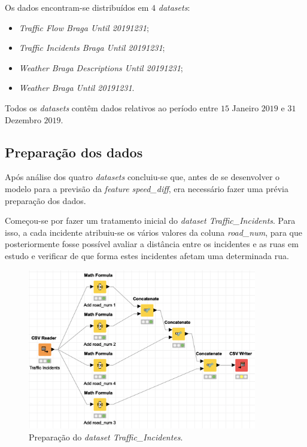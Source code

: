 \documentclass[a4paper, 12pt]{article}
\begin{document}
Os dados encontram-se distribuídos em $4$ \textit{datasets}:

\begin{itemize}
	\item \textit{Traffic Flow Braga Until 20191231};
	\item \textit{Traffic Incidents Braga Until 20191231};
	\item \textit{Weather Braga Descriptions Until 20191231};
	\item \textit{Weather Braga Until 20191231}.
\end{itemize}

Todos os \textit{datasets} contêm dados relativos ao período entre $15$ Janeiro $2019$ e $31$ Dezembro $2019$.

\subsection{Preparação dos dados}
\label{section:falta}

Após análise dos quatro \textit{datasets} concluiu-se que, antes de se desenvolver o modelo para a previsão da \textit{feature speed\_diff}, era necessário fazer uma prévia preparação dos dados.

Começou-se por fazer um tratamento inicial do \textit{dataset Traffic\_Incidents}. Para isso, a cada incidente atribuiu-se os vários valores da coluna \textit{road\_num}, para que posteriormente fosse possível avaliar a distância entre os incidentes e as ruas em estudo e verificar de que forma estes incidentes afetam uma determinada rua.

\begin{figure}[H]
	\centering
	\includegraphics[width=10cm]{Traffic_Incidents}
	\caption{Preparação do \textit{dataset Traffic\_Incidentes}.}
\end{figure}
\end{document}
